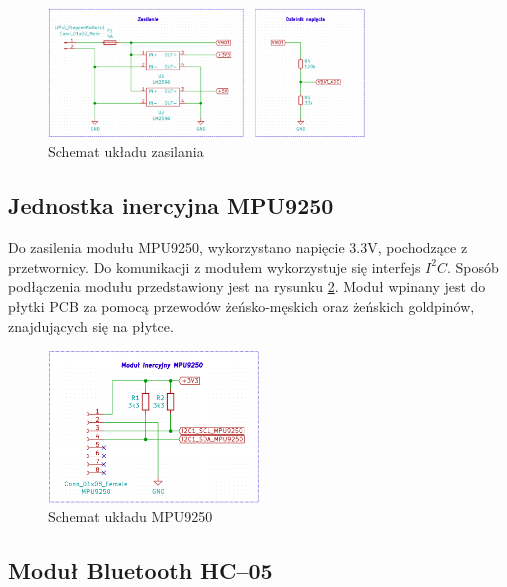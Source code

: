 \begin{figure}[h!]
    \centering
    \includegraphics[width=0.75\textwidth]{Rysunki/Rozdzial05/Zasilanie_schemat.png}
    \caption{Schemat układu zasilania}
    \label{Zasilanie schemat}
\end{figure}

\subsection{Jednostka inercyjna MPU9250}

Do zasilenia modułu MPU9250, wykorzystano napięcie 3.3V, pochodzące z przetwornicy. Do komunikacji z modułem wykorzystuje się interfejs $I^2C$. Sposób podłączenia modułu przedstawiony jest na rysunku \ref{MPU9250 schemat}. Moduł wpinany jest do płytki PCB za pomocą przewodów żeńsko-męskich oraz żeńskich goldpinów, znajdujących się na płytce.

\begin{figure}[h!]
    \centering
    \includegraphics[width=0.5\textwidth]{Rysunki/Rozdzial05/MPU9250_schemat.png}
    \caption{Schemat układu MPU9250}
    \label{MPU9250 schemat}
\end{figure}

\subsection{Moduł Bluetooth HC--05}

